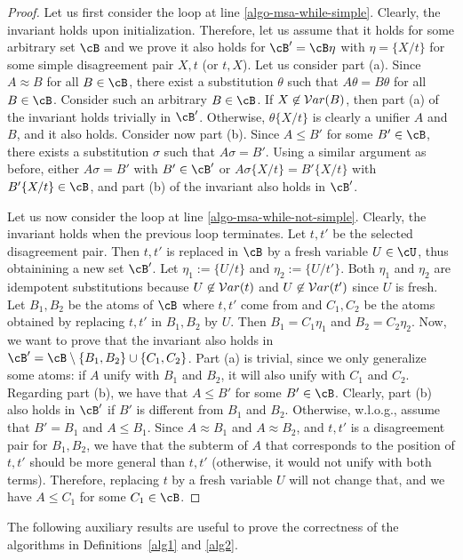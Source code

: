 \documentclass[fleqn]{tlp}
\begin{document}
\begin{appendix}
\begin{proof}
  Let us first consider the loop at line
  \ref{algo-msa-while-simple}. Clearly, the invariant holds upon
  initialization. Therefore, let us assume that it holds for some
  arbitrary set $\cB$ and we prove it also holds for $\cB' = \cB\eta$
  with $\eta = \{X/t\}$ for some simple disagreement pair $X,t$ (or
  $t,X$).  
Let us consider part (a).  Since $A\approx B$ for all $B\in\cB$,
  there exist a substitution $\theta$ such that $A\theta=B\theta$ for
  all $B\in\cB$. Consider such an arbitrary $B\in\cB$. If
  $X\not\in{\cal V}ar(B)$, then part (a) of the invariant holds trivially in
  $\cB'$. Otherwise, $\theta\{X/t\}$ is clearly a unifier $A$ and $B$,
  and it also holds. 
Consider now part (b). Since $A\leq B'$ for some $B'\in\cB$, there
  exists a substitution $\sigma$ such that $A\sigma=B'$. Using a
  similar argument as before, either $A\sigma=B'$ with $B'\in\cB'$ or
  $A\sigma\{X/t\}=B'\{X/t\}$ with $B'\{X/t\}\in\cB$, and part (b) of
  the invariant also holds in $\cB'$.

  Let us now consider the loop at line
  \ref{algo-msa-while-not-simple}. Clearly, the invariant holds when
  the previous loop terminates. 
Let $t,t'$ be the selected disagreement pair.
  Then $t,t'$ is replaced in $\cB$ by a fresh variable
  $U\in \cU$, thus obtainining a new set $\cB'$.
  Let $\eta_1:=\{U/t\}$ and $\eta_2:=\{U/t'\}$. Both $\eta_1$ and $\eta_2$
  are idempotent substitutions because $U\not\in {\cal V}ar(t)$ and $U\not\in
  {\cal V}ar(t')$ since $U$ is fresh.
  Let $B_1,B_2$ be the atoms of $\cB$ where $t,t'$ come from
  and $C_1,C_2$ be the atoms obtained by replacing
  $t,t'$ in $B_1,B_2$ by $U$. Then $B_1=C_1\eta_1$ and
  $B_2=C_2\eta_2$. 
Now, we want to prove that the invariant also holds in $\cB' =
  \cB\setminus\{B_1,B_2\}\cup\{C_1,C_2\}$. Part (a) is trivial, since
  we only generalize some atoms: if $A$ unify with $B_1$ and $B_2$, it
  will also unify with $C_1$ and $C_2$. Regarding part (b), we have
  that $A\leq B'$ for some $B'\in\cB$. Clearly, part (b) also holds in
  $\cB'$ if $B'$ is different from $B_1$ and $B_2$. Otherwise,
  w.l.o.g., assume that $B'=B_1$ and $A\leq B_1$. Since $A\approx B_1$
  and $A\approx B_2$, and $t,t'$ is a disagreement pair for $B_1,B_2$,
  we have that the subterm of $A$ that corresponds to the position of
  $t,t'$ should be more general than $t,t'$ (otherwise, it would not
  unify with both terms). Therefore, replacing $t$ by a fresh variable
  $U$ will not change that, and we have $A\leq C_1$ for some
  $C_1\in\cB$.
\end{proof}
The following auxiliary results are useful to prove the correctness of
the algorithms in Definitions~\ref{alg1} and \ref{alg2}. 


\end{appendix}
\end{document}
